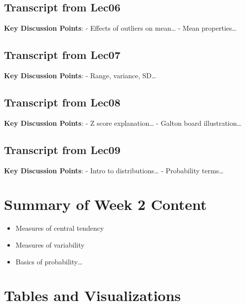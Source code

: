 \documentclass[
  letterpaper,
  DIV=11,
  numbers=noendperiod]{scrreprt}
\providecommand{\tightlist}{%
  \setlength{\itemsep}{0pt}\setlength{\parskip}{0pt}}
\begin{document}
\section{Transcript from Lec06}\label{transcript-from-lec06}

\textbf{Key Discussion Points}: - Effects of outliers on mean\ldots{} -
Mean properties\ldots{}

\section{Transcript from Lec07}\label{transcript-from-lec07}

\textbf{Key Discussion Points}: - Range, variance, SD\ldots{}

\section{Transcript from Lec08}\label{transcript-from-lec08}

\textbf{Key Discussion Points}: - Z score explanation\ldots{} - Galton
board illustration\ldots{}

\section{Transcript from Lec09}\label{transcript-from-lec09}

\textbf{Key Discussion Points}: - Intro to distributions\ldots{} -
Probability terms\ldots{}


\chapter{Summary of Week 2 Content}\label{summary-of-week-2-content}

\begin{itemize}
\tightlist
\item
  Measures of central tendency
\item
  Measures of variability
\item
  Basics of probability\ldots{}
\end{itemize}


\chapter{Tables and Visualizations}\label{tables-and-visualizations}
\end{document}
